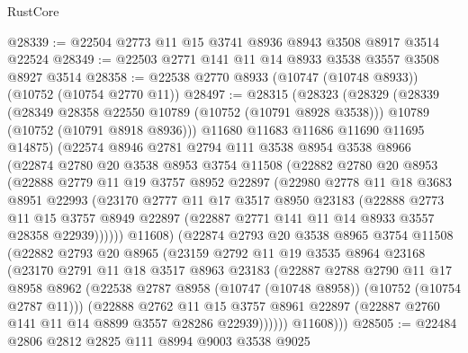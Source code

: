 \begin{lexlean}{RustCore}
\begin{coremodule}
@28339 := @22504 @2773 @11 @15 @3741 @8936 @8943 @3508 @8917 @3514 @22524
@28349 := @22503 @2771 @141 @11 @14 @8933 @3538 @3557 @3508 @8927 @3514
@28358 := @22538 @2770 @8933 (@10747 (@10748 @8933)) (@10752 (@10754 @2770 @11))
@28497 := @28315
    (@28323
      (@28329
        (@28339
          (@28349 @28358 @22550 @10789 (@10752 (@10791 @8928 @3538)))
          @10789
          (@10752 (@10791 @8918 @8936)))
        @11680
        @11683
        @11686
        @11690
        @11695
        @14875)
      (@22574
        @8946
        @2781
        @2794
        @111
        @3538
        @8954
        @3538
        @8966
        (@22874
          @2780
          @20
          @3538
          @8953
          @3754
          @11508
          (@22882
            @2780
            @20
            @8953
            (@22888
              @2779
              @11
              @19
              @3757
              @8952
              @22897
              (@22980
                @2778
                @11
                @18
                @3683
                @8951
                @22993
                (@23170
                  @2777
                  @11
                  @17
                  @3517
                  @8950
                  @23183
                  (@22888
                    @2773
                    @11
                    @15
                    @3757
                    @8949
                    @22897
                    (@22887 @2771 @141 @11 @14 @8933 @3557 @28358 @22939))))))
          @11608)
        (@22874
          @2793
          @20
          @3538
          @8965
          @3754
          @11508
          (@22882
            @2793
            @20
            @8965
            (@23159
              @2792
              @11
              @19
              @3535
              @8964
              @23168
              (@23170
                @2791
                @11
                @18
                @3517
                @8963
                @23183
                (@22887
                  @2788
                  @2790
                  @11
                  @17
                  @8958
                  @8962
                  (@22538 @2787 @8958 (@10747 (@10748 @8958)) (@10752 (@10754 @2787 @11)))
                  (@22888
                    @2762
                    @11
                    @15
                    @3757
                    @8961
                    @22897
                    (@22887 @2760 @141 @11 @14 @8899 @3557 @28286 @22939))))))
          @11608)))
@28505 := @22484 @2806 @2812 @2825 @111 @8994 @9003 @3538 @9025

\end{coremodule}
\end{lexlean}
